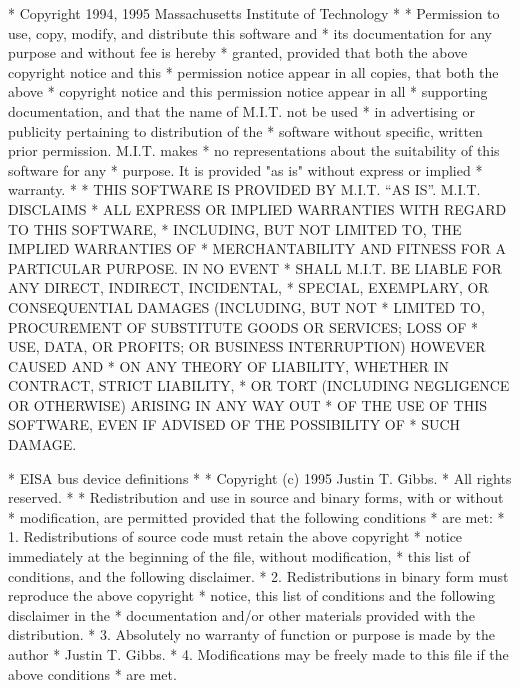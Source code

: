 \begin{copyrightEnv}
 * Copyright 1994, 1995 Massachusetts Institute of Technology
 *
 * Permission to use, copy, modify, and distribute this software and
 * its documentation for any purpose and without fee is hereby
 * granted, provided that both the above copyright notice and this
 * permission notice appear in all copies, that both the above
 * copyright notice and this permission notice appear in all
 * supporting documentation, and that the name of M.I.T. not be used
 * in advertising or publicity pertaining to distribution of the
 * software without specific, written prior permission.  M.I.T. makes
 * no representations about the suitability of this software for any
 * purpose.  It is provided "as is" without express or implied
 * warranty.
 *
 * THIS SOFTWARE IS PROVIDED BY M.I.T. ``AS IS''.  M.I.T. DISCLAIMS
 * ALL EXPRESS OR IMPLIED WARRANTIES WITH REGARD TO THIS SOFTWARE,
 * INCLUDING, BUT NOT LIMITED TO, THE IMPLIED WARRANTIES OF
 * MERCHANTABILITY AND FITNESS FOR A PARTICULAR PURPOSE. IN NO EVENT
 * SHALL M.I.T. BE LIABLE FOR ANY DIRECT, INDIRECT, INCIDENTAL,
 * SPECIAL, EXEMPLARY, OR CONSEQUENTIAL DAMAGES (INCLUDING, BUT NOT
 * LIMITED TO, PROCUREMENT OF SUBSTITUTE GOODS OR SERVICES; LOSS OF
 * USE, DATA, OR PROFITS; OR BUSINESS INTERRUPTION) HOWEVER CAUSED AND
 * ON ANY THEORY OF LIABILITY, WHETHER IN CONTRACT, STRICT LIABILITY,
 * OR TORT (INCLUDING NEGLIGENCE OR OTHERWISE) ARISING IN ANY WAY OUT
 * OF THE USE OF THIS SOFTWARE, EVEN IF ADVISED OF THE POSSIBILITY OF
 * SUCH DAMAGE.
\end{copyrightEnv}

\begin{copyrightEnv}
 * EISA bus device definitions
 *
 * Copyright (c) 1995 Justin T. Gibbs.
 * All rights reserved.
 *
 * Redistribution and use in source and binary forms, with or without
 * modification, are permitted provided that the following conditions
 * are met:
 * 1. Redistributions of source code must retain the above copyright
 *    notice immediately at the beginning of the file, without modification,
 *    this list of conditions, and the following disclaimer.
 * 2. Redistributions in binary form must reproduce the above copyright
 *    notice, this list of conditions and the following disclaimer in the
 *    documentation and/or other materials provided with the distribution.
 * 3. Absolutely no warranty of function or purpose is made by the author
 *    Justin T. Gibbs.
 * 4. Modifications may be freely made to this file if the above conditions
 *    are met.
\end{copyrightEnv}

